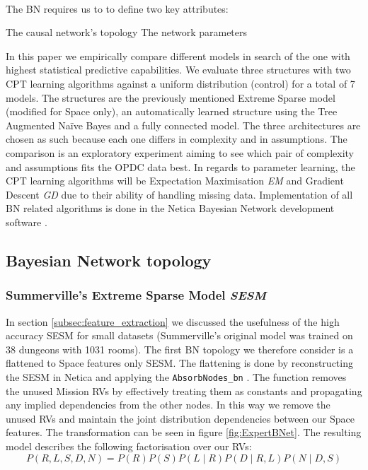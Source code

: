 \documentclass{UoYCSproject}
\begin{document}
\paragraph{}
The BN requires us to to define two key attributes:
\begin{outline}[enumerate]
  \1 The causal network's topology
  \1 The network parameters
\end{outline}
In this paper we empirically compare different models in search of the one with highest statistical predictive capabilities. We evaluate three structures with two CPT learning algorithms against a uniform distribution (control) for a total of 7 models. The structures are the previously mentioned Extreme Sparse model (modified for Space only), an automatically learned structure using the Tree Augmented Na\"{i}ve Bayes and a fully connected model. The three architectures are chosen as such because each one differs in complexity and in assumptions. The comparison is an exploratory experiment aiming to see which pair of complexity and assumptions fits the OPDC data best. In regards to parameter learning, the CPT learning algorithms will be Expectation Maximisation \textit{EM} and Gradient Descent \textit{GD} due to their ability of handling missing data. Implementation of all BN related algorithms is done in the Netica Bayesian Network development software \parencite{netica}.

\subsection{Bayesian Network topology}
\subsubsection{Summerville's Extreme Sparse Model \textit{SESM}}
In section \ref{subsec:feature_extraction} we discussed the usefulness of the high accuracy SESM for small datasets (Summerville's original model was trained on 38 dungeons with 1031 rooms). The first BN topology we therefore consider is a flattened to Space features only SESM. The flattening is done by reconstructing the SESM in Netica and applying the \texttt{AbsorbNodes\_bn} \parencite[62-63]{neticaCman}. The function removes the unused Mission RVs by effectively treating them as constants and propagating any implied dependencies from the other nodes. In this way we remove the unused RVs and maintain the joint distribution dependencies between our Space features. The transformation can be seen in figure \ref{fig:ExpertBNet}. The resulting model describes the following factorisation over our RVs:
\begin{equation}
  \label{eq:SESM}
  P(R,L,S,D,N) = P(R)P(S)P(L \mid R)P(D \mid R, L)P(N \mid D, S)
\end{equation}
\end{document}
